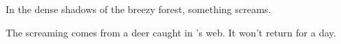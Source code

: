 \begin{boxtext}
  In the dense shadows of the breezy forest, something screams.
\end{boxtext}

The screaming comes from a deer caught in 's web.
It won't return for a day.
